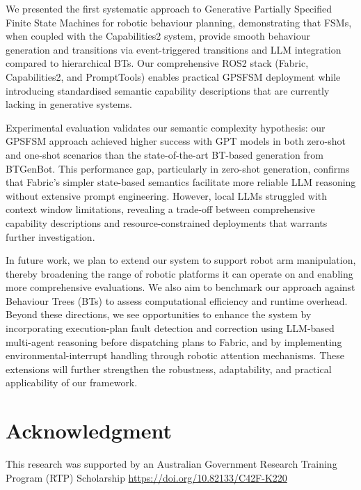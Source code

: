 \documentclass[letterpaper, 10pt, conference]{ieeeconf}      %
\begin{document}
We presented the first systematic approach to Generative Partially Specified Finite State Machines for robotic behaviour planning, demonstrating that FSMs, when coupled with the Capabilities2 system, provide smooth behaviour generation and transitions via event-triggered transitions and LLM integration compared to hierarchical BTs. Our comprehensive ROS2 stack (Fabric, Capabilities2, and PromptTools) enables practical GPSFSM deployment while introducing standardised semantic capability descriptions that are currently lacking in generative systems.

Experimental evaluation validates our semantic complexity hypothesis: our GPSFSM approach achieved higher success with GPT models in both zero-shot and one-shot scenarios than the state-of-the-art BT-based generation from BTGenBot. This performance gap, particularly in zero-shot generation, confirms that Fabric's simpler state-based semantics facilitate more reliable LLM reasoning without extensive prompt engineering. However, local LLMs struggled with context window limitations, revealing a trade-off between comprehensive capability descriptions and resource-constrained deployments that warrants further investigation.

In future work, we plan to extend our system to support robot arm manipulation, thereby broadening the range of robotic platforms it can operate on and enabling more comprehensive evaluations. We also aim to benchmark our approach against Behaviour Trees (BTs) to assess computational efficiency and runtime overhead. Beyond these directions, we see opportunities to enhance the system by incorporating execution-plan fault detection and correction using LLM-based multi-agent reasoning before dispatching plans to Fabric, and by implementing environmental-interrupt handling through robotic attention mechanisms. These extensions will further strengthen the robustness, adaptability, and practical applicability of our framework.




\section*{Acknowledgment}

This research was supported by an Australian Government Research Training Program (RTP) Scholarship \url{https://doi.org/10.82133/C42F-K220}


\raggedbottom


\end{document}
